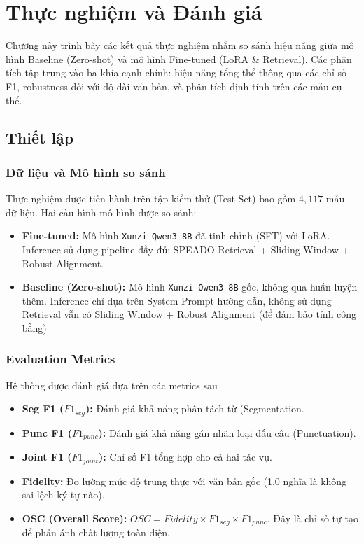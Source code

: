 \chapter{Thực nghiệm và Đánh giá}
\label{chap:experiments}

Chương này trình bày các kết quả thực nghiệm nhằm so sánh hiệu năng giữa mô hình Baseline (Zero-shot) và mô hình Fine-tuned (LoRA \& Retrieval). Các phân tích tập trung vào ba khía cạnh chính: hiệu năng tổng thể thông qua các chỉ số F1, robustness đối với độ dài văn bản, và phân tích định tính trên các mẫu cụ thể.

\section{Thiết lập}

\subsection{Dữ liệu và Mô hình so sánh}
Thực nghiệm được tiến hành trên tập kiểm thử (Test Set) bao gồm $4,117$ mẫu dữ liệu. Hai cấu hình mô hình được so sánh:
\begin{itemize}
    \item \textbf{Fine-tuned:} Mô hình \texttt{Xunzi-Qwen3-8B} đã tinh chỉnh (SFT) với LoRA. Inference sử dụng pipeline đầy đủ: SPEADO Retrieval + Sliding Window + Robust Alignment.
    \item \textbf{Baseline (Zero-shot):} Mô hình \texttt{Xunzi-Qwen3-8B} gốc, không qua huấn luyện thêm. Inference chỉ dựa trên System Prompt hướng dẫn, không sử dụng Retrieval vẫn có Sliding Window + Robust Alignment (để đảm bảo tính công bằng)
\end{itemize}

\subsection{Evaluation Metrics}
Hệ thống được đánh giá dựa trên các metrics sau
\begin{itemize}
    \item \textbf{Seg F1 ($F1_{seg}$):} Đánh giá khả năng phân tách từ (Segmentation.
    \item \textbf{Punc F1 ($F1_{punc}$):} Đánh giá khả năng gán nhãn loại dấu câu (Punctuation).
    \item \textbf{Joint F1 ($F1_{joint}$):} Chỉ số F1 tổng hợp cho cả hai tác vụ.
    \item \textbf{Fidelity:} Đo lường mức độ trung thực với văn bản gốc (1.0 nghĩa là không sai lệch ký tự nào).
    \item \textbf{OSC (Overall Score):} $OSC = Fidelity \times F1_{seg} \times F1_{punc}$. Đây là chỉ số tự tạo để phản ánh chất lượng toàn diện.
\end{itemize}

